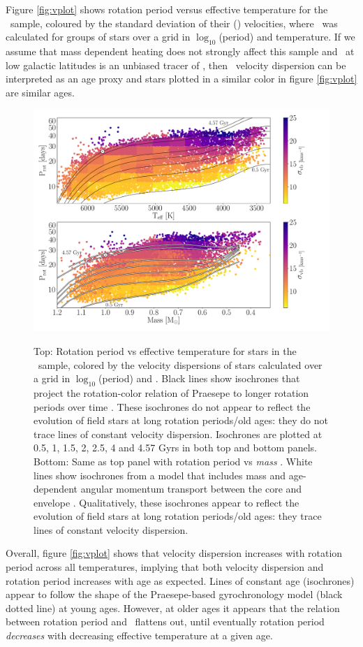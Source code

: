 Figure \ref{fig:vplot} shows rotation period versus effective temperature for
the \mct\ sample, coloured by the standard deviation of their (\vb)
velocities, where \sigmavb\ was calculated for groups of stars over a grid in
$\log_{10}$(period) and temperature.
If we assume that mass dependent heating does not strongly affect this sample
and \vb\ at low galactic latitudes is an unbiased tracer of \vz, then \vb\
velocity dispersion can be interpreted as an age proxy and stars plotted in a
similar color in figure \ref{fig:vplot} are similar ages.
\begin{figure}
  \caption{
    Top: Rotation period vs effective temperature for stars in the \mct\
    sample, colored by the velocity dispersions of stars calculated over a
    grid in $\log_{10}$(period) and \teff.
    Black lines show isochrones that project the rotation-color relation of
    Praesepe to longer rotation periods over time \citep{angus2019}.
    These isochrones do not appear to reflect the evolution of field stars at
    long rotation periods/old ages: they do not trace lines of constant
    velocity dispersion.
    Isochrones are plotted at 0.5, 1, 1.5, 2, 2.5, 4 and 4.57 Gyrs in both top
    and bottom panels.
    Bottom: Same as top panel with rotation period vs {\it mass}
    \citep[from the Kepler Input Catalog][]{brown2011}.
    White lines show isochrones from a model that includes mass and
    age-dependent angular momentum transport between the core and envelope
    \citep{spada2019}.
    Qualitatively, these isochrones appear to reflect the evolution of field
    stars at long rotation periods/old ages: they trace lines of constant
    velocity dispersion.
}
  \centering
    \includegraphics[width=1\textwidth]{main_figure}
\label{fig:main_figure}
\end{figure}
Overall, figure \ref{fig:vplot} shows that velocity dispersion increases with
rotation period across all temperatures, implying that both velocity
dispersion and rotation period increases with age as expected.
Lines of constant age (isochrones) appear to follow the shape of the
Praesepe-based gyrochronology model (black dotted line) at young ages.
However, at older ages it appears that the relation between rotation period
and \teff\ flattens out, until eventually rotation period {\it decreases} with
decreasing effective temperature at a given age.

